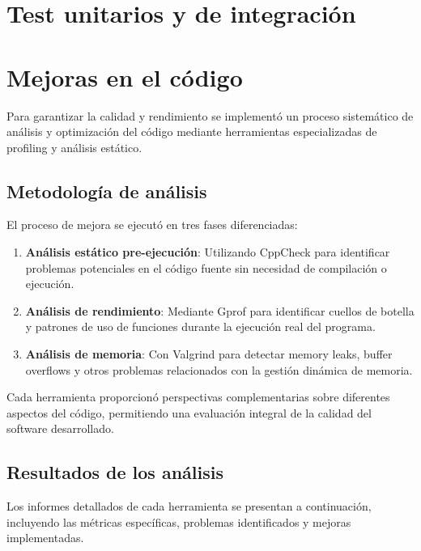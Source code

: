 \documentclass[12pt,a4paper]{article}
\begin{document}
\section{Test unitarios y de integración}
% 


\section{Mejoras en el código}

Para garantizar la calidad y rendimiento se implementó un proceso sistemático de análisis y optimización del código mediante herramientas especializadas de profiling y análisis estático.


\subsection{Metodología de análisis}

El proceso de mejora se ejecutó en tres fases diferenciadas:

\begin{enumerate}
\item \textbf{Análisis estático pre-ejecución}: Utilizando CppCheck para identificar problemas potenciales en el código fuente sin necesidad de compilación o ejecución.

\item \textbf{Análisis de rendimiento}: Mediante Gprof para identificar cuellos de botella y patrones de uso de funciones durante la ejecución real del programa.

\item \textbf{Análisis de memoria}: Con Valgrind para detectar memory leaks, buffer overflows y otros problemas relacionados con la gestión dinámica de memoria.
\end{enumerate}

Cada herramienta proporcionó perspectivas complementarias sobre diferentes aspectos del código, permitiendo una evaluación integral de la calidad del software desarrollado.

\subsection{Resultados de los análisis}

Los informes detallados de cada herramienta se presentan a continuación, incluyendo las métricas específicas, problemas identificados y mejoras implementadas.
\end{document}
